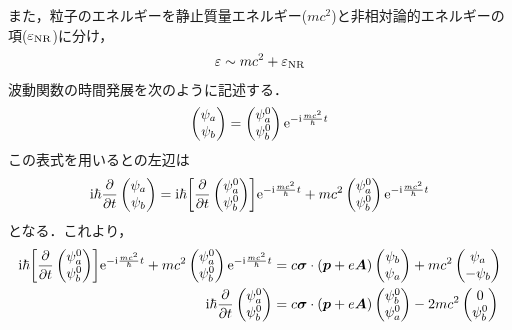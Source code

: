 \documentclass{report}
\begin{document}
また，粒子のエネルギーを静止質量エネルギー($mc^2$)と非相対論的エネルギーの項($\varepsilon_{\mathrm{NR}}$)に分け，
\begin{align}
  \varepsilon \sim mc^2 + \varepsilon_{\mathrm{NR}}
\end{align}
波動関数の時間発展を次のように記述する．
\begin{align}
  \begin{pmatrix}
    \psi_a\\
    \psi_b
  \end{pmatrix}
  =
  \begin{pmatrix}
    \psi_a^0\\
    \psi_b^0
  \end{pmatrix}
  \mathrm{e}^{-\mathrm{i} \frac{mc^2}{\hbar}t}
\end{align}
この表式を用いるとの左辺は
\begin{align}
  \mathrm{i}\hbar \frac{\partial}{\partial t}
  \begin{pmatrix}
    \psi_a\\
    \psi_b
  \end{pmatrix}
  =
  \mathrm{i}\hbar\qty[
    \frac{\partial}{\partial t}
    \begin{pmatrix}
      \psi_a^0\\
      \psi_b^0
    \end{pmatrix}
  ]
  \mathrm{e}^{-\mathrm{i}\frac{mc^2}{\hbar}t}
  + mc^2
  \begin{pmatrix}
    \psi_a^0\\
    \psi_b^0
  \end{pmatrix}
  \mathrm{e}^{-\mathrm{i}\frac{mc^2}{\hbar}t}
\end{align}
となる．これより，
\begin{align}
  \mathrm{i}\hbar\qty[
    \frac{\partial}{\partial t}
    \begin{pmatrix}
      \psi_a^0\\
      \psi_b^0
    \end{pmatrix}
  ]
  \mathrm{e}^{-\mathrm{i}\frac{mc^2}{\hbar}t}
  + mc^2
  \begin{pmatrix}
    \psi_a^0\\
    \psi_b^0
  \end{pmatrix}
  \mathrm{e}^{-\mathrm{i}\frac{mc^2}{\hbar}t}
  &=
  c\bm{\sigma}\cdot(\bm{p} + e\bm{A})
  \begin{pmatrix}
    \psi_b\\
    \psi_a
  \end{pmatrix}
  +mc^2
  \begin{pmatrix}
    \psi_a\\
    -\psi_b
  \end{pmatrix}\\
  \mathrm{i}\hbar\frac{\partial}{\partial t}
  \begin{pmatrix}
    \psi_a^0\\
    \psi_b^0
  \end{pmatrix}
  &=
  c\bm{\sigma}\cdot(\bm{p} + e\bm{A})
  \begin{pmatrix}
    \psi_b^0\\
    \psi_a^0
  \end{pmatrix}
  -2mc^2
  \begin{pmatrix}
    0\\
    \psi_b^0
  \end{pmatrix}
\end{align}
\end{document}
